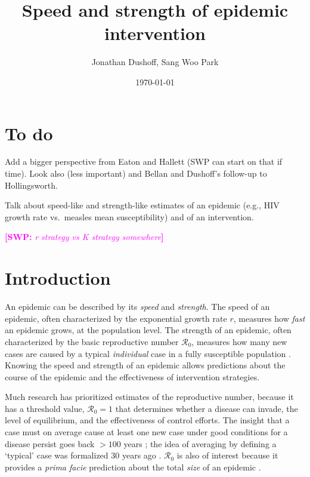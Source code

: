 \documentclass[12pt]{article}\usepackage[]{graphicx}\usepackage[]{color}
\title{Speed and strength of epidemic intervention}
\author{Jonathan Dushoff, Sang Woo Park}
\date{\today}
\newcommand{\comment}[3]{\textcolor{#1}{\textbf{[#2: }\textit{#3}\textbf{]}}}
\newcommand{\swp}[1]{\comment{magenta}{SWP}{#1}}
\newcommand{\RR}{\ensuremath{{\mathcal R}}}
\begin{document}
\maketitle

\section{To do}

Add a bigger perspective from Eaton and Hallett (SWP can start on that if time). Look also (less important) and Bellan and Dushoff's follow-up to Hollingsworth.

Talk about speed-like and strength-like estimates of an epidemic (e.g., HIV growth rate vs.~measles mean susceptibility) and of an intervention.

\swp{r strategy vs K strategy somewhere}

\section{Introduction}

An epidemic can be described by its \emph{speed} and \emph{strength}.
The speed of an epidemic, often characterized by the exponential growth rate $r$, measures how \emph{fast} an epidemic grows, at the population level. 
The strength of an epidemic, often characterized by the basic reproductive number $\RR_0$, measures how many new cases are caused by a typical \emph{individual} case in a fully susceptible population \citep{anderson1991infectious, diekmann1990definition}.
Knowing the speed and strength of an epidemic allows predictions about the course of the epidemic and the effectiveness of intervention strategies.

Much research has prioritized estimates of the reproductive number, because it has a threshold value, $\RR_0=1$ that determines whether a disease can invade, the level of equilibrium, and the effectiveness of control efforts.
The insight that a case must on average cause at least one new case under good conditions for a disease persist goes back $>100$ years \citep{ross1911prevention};
the idea of averaging by defining a `typical' case was formalized 30 years ago \citep{diekmann1990definition}.
$\RR_0$ is also of interest because it provides a \emph{prima facie} prediction about the total \emph{size} of an epidemic \citep{anderson1991infectious, ma2006generality, miller2012note}.
\end{document}

